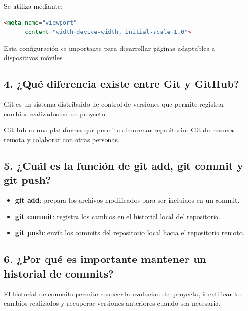 \documentclass{article}
\begin{document}
Se utiliza mediante:

\begin{lstlisting}[language=HTML]
<meta name="viewport"
      content="width=device-width, initial-scale=1.0">
\end{lstlisting}

Esta configuración es importante para desarrollar páginas
adaptables a dispositivos móviles.

\subsection{4. ¿Qué diferencia existe entre Git y GitHub?}

Git es un sistema distribuido de control de versiones que
permite registrar cambios realizados en un proyecto.

GitHub es una plataforma que permite almacenar repositorios
Git de manera remota y colaborar con otras personas.

\subsection{5. ¿Cuál es la función de git add, git commit
y git push?}

\begin{itemize}

    \item \textbf{git add}: prepara los archivos modificados
    para ser incluidos en un commit.

    \item \textbf{git commit}: registra los cambios en el
    historial local del repositorio.

    \item \textbf{git push}: envía los commits del repositorio
    local hacia el repositorio remoto.

\end{itemize}

\subsection{6. ¿Por qué es importante mantener un historial
de commits?}

El historial de commits permite conocer la evolución del proyecto,
identificar los cambios realizados y recuperar versiones
anteriores cuando sea necesario.
\end{document}
